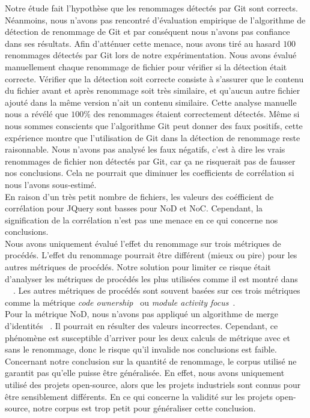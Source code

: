 Notre étude fait l'hypothèse que les renommages détectés par Git sont corrects. Néanmoins, nous n'avons pas rencontré d'évaluation empirique de l'algorithme de détection de renommage de Git et par conséquent nous n'avons pas confiance dans ses résultats. Afin d'atténuer cette menace, nous avons tiré au hasard $100$ renommages détectés par Git lors de notre expérimentation. Nous avons évalué manuellement chaque renommage de fichier pour vérifier si la détection était correcte. Vérifier que la détection soit correcte consiste à s'assurer que le contenu du fichier avant et après renommage soit très similaire, et qu'aucun autre fichier ajouté dans la même version n'ait un contenu similaire. Cette analyse manuelle nous a révélé que  $100\%$ des renommages étaient correctement détectés. Même si nous sommes conscients que l'algorithme Git peut donner des faux positifs, cette expérience montre que l'utilisation de Git dans la détection de renommage reste raisonnable. Nous n'avons pas analysé les faux négatifs, c'est à dire les vrais renommages de fichier non détectés par Git, car ça ne risquerait pas de fausser nos conclusions. Cela ne pourrait que diminuer les coefficients de corrélation si nous l'avons sous-estimé.\\  

En raison d'un très petit nombre de fichiers, les valeurs des coéfficient de corrélation pour JQuery sont basses pour NoD et NoC. Cependant, la signification de la corrélation n'est pas une menace en ce qui concerne nos conclusions.\\

Nous avons uniquement évalué l'effet du renommage sur trois métriques de procédés. L'effet du renommage pourrait être différent (mieux ou pire) pour les autres métriques de procédés. Notre solution pour limiter ce risque était d'analyser les métriques de procédés les plus utilisées comme il est montré dans ~~\cite{radjenovic_software_2013}. Les autres métriques de procédés sont souvent basées sur ces trois métriques comme la métrique \emph{code ownership}~\cite{bird_dont_2011} ou \emph{module activity focus}~\cite{posnett_dual_2013}.\\

Pour la métrique NoD, nous n'avons pas appliqué un algorithme de merge d'identités ~\cite{goeminne_comparison_2013}. Il pourrait en résulter des valeurs incorrectes. Cependant, ce phénomène est susceptible d'arriver pour les deux calculs de métrique avec et sans le renommage, donc le risque qu'il invalide nos conclusions est faible.\\

Concernant notre conclusion sur la quantité de renommage, le corpus utilisé ne garantit pas qu'elle puisse être généralisée. En effet, nous avons uniquement utilisé des projets open-source, alors que les projets industriels sont connus pour être sensiblement différents. En ce qui concerne la validité sur les projets open-source, notre corpus est trop petit pour généraliser cette conclusion.\\

